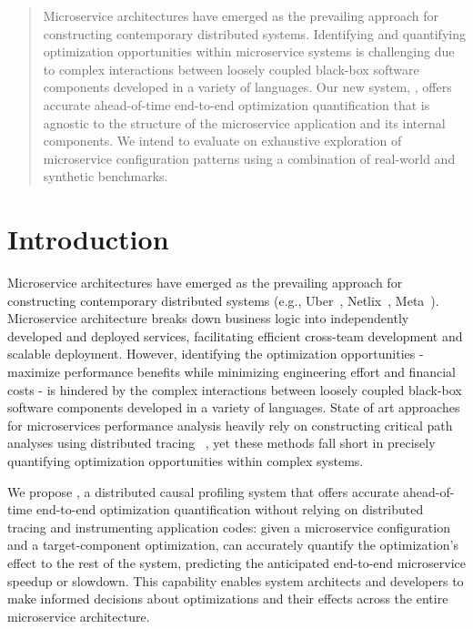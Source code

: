 
\label{sec:text}

\begin{abstract}

Microservice architectures have emerged as the prevailing approach for constructing contemporary distributed systems. 
Identifying and quantifying optimization opportunities within microservice systems is challenging due to complex interactions between loosely coupled black-box software components developed in a variety of languages. 
Our new system, \ours, offers accurate ahead-of-time end-to-end optimization quantification that is agnostic to the structure 
of the microservice application and its internal components. We intend to evaluate \ours on exhaustive exploration of microservice configuration 
patterns using a combination of real-world and synthetic benchmarks.

\end{abstract}

\section{Introduction}

Microservice architectures have emerged as the prevailing approach for constructing contemporary distributed systems (e.g., Uber~\cite{uber}, Netlix~\cite{netflix}, Meta~\cite{meta}). 
Microservice architecture breaks down business logic into independently developed and deployed services, facilitating efficient cross-team 
development and scalable deployment. 
However, identifying the optimization opportunities - maximize performance benefits while minimizing engineering 
effort and financial costs - is hindered by the complex interactions between loosely coupled black-box software components 
developed in a variety of languages. State of art approaches for microservices performance analysis heavily rely on constructing
critical path analyses using distributed tracing ~\cite{mystery_machine,crisp}, yet these methods fall short in precisely 
quantifying optimization opportunities within complex systems.

We propose \ours, a distributed causal profiling system that offers accurate ahead-of-time end-to-end 
optimization quantification without relying on distributed tracing and instrumenting application codes: 
given a microservice configuration and a target-component optimization, \ours can accurately quantify the optimization's 
effect to the rest of the system, predicting the anticipated end-to-end microservice speedup or slowdown. This capability enables system 
architects and developers to make informed decisions about optimizations and their effects across the entire microservice architecture.



